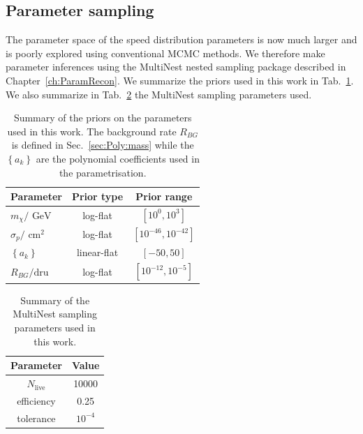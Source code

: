 \subsection{Parameter sampling}
\label{sec:Poly:ParamRecon}
The parameter space of the speed distribution parameters is now much larger and is poorly explored using conventional MCMC methods. We therefore make parameter inferences using the MultiNest nested sampling package described in Chapter~\ref{ch:ParamRecon}. We summarize the priors used in this work in Tab.~\ref{tab:Poly:priors}. We also summarize in Tab.~\ref{tab:Poly:MultiNest} the MultiNest sampling parameters used.

\begin{table}[t]
  \setlength{\extrarowheight}{2pt}
  \setlength{\tabcolsep}{3pt}
  \begin{center}
	\begin{tabular}{m{1in}|cc}
        \hline\hline
	Parameter & Prior type & Prior range\\
	\hline
	$m_\chi / \textrm{ GeV}$ &  log-flat & $\left[10^{0}, 10^{3}\right]$\\
	$\sigma_p / \textrm{ cm}^2$ & log-flat & $\left[10^{-46}, 10^{-42}\right]$ \\
	$\left\{a_k\right\}$ & linear-flat & $\left[-50, 50\right]$ \\
        $R_{BG} / \textrm{dru}$ & log-flat & $\left[10^{-12}, 10^{-5}\right]$ \\
        \hline\hline
	\end{tabular}
  \end{center}
\caption{Summary of the priors on the parameters used in this work. The background rate $R_{BG}$ is defined in Sec.~\ref{sec:Poly:mass} while the $\left\{a_k\right\}$ are the polynomial coefficients used in the parametrisation.}
\label{tab:Poly:priors}
\end{table}

\begin{table}[t]
  \setlength{\extrarowheight}{2pt}
  \setlength{\tabcolsep}{3pt}
  \begin{center}
	\begin{tabular}{c|c}
        \hline\hline
        Parameter & Value \\
        \hline
	$N_\textrm{live}$ & 10000 \\
	efficiency & 0.25 \\
	tolerance & $10^{-4}$ \\
        \hline\hline
	\end{tabular}
  \end{center}
\caption{Summary of the MultiNest sampling parameters used in this work.}
\label{tab:Poly:MultiNest}
\end{table}

